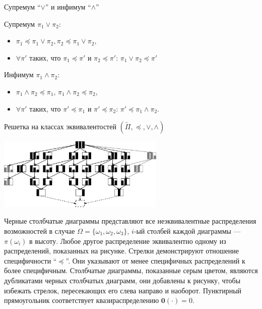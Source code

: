 \documentclass[russian, unicode, mathserif, aspectratio=169]{beamer}
\begin{document}
\begin{frame}{Супремум ``$\lor$'' и инфимум ``$\land$'' }
	
    \begin{definition}
    Супремум $\pi_1 \lor \pi_2$:
    \begin{itemize}
        \item $\pi_1 \preceq \pi_1 \lor \pi_2, \pi_2 \preceq \pi_1 \lor \pi_2$,
        \item $\forall \pi'$ таких, что $\pi_1 \preceq \pi'$ и $\pi_2 \preceq \pi'$: $\pi_1 \lor \pi_2 \preceq \pi'$
    \end{itemize}
    \end{definition}
    \begin{definition}
    Инфимум $\pi_1 \land \pi_2$:
    \begin{itemize}
        \item $\pi_1 \land \pi_2 \preceq \pi_1$, $\pi_1 \land \pi_2 \preceq \pi_2$,
        \item $\forall \pi'$ таких, что $\pi' \preceq \pi_1$ и $\pi' \preceq \pi_2$: $\pi' \preceq \pi_1 \land \pi_2$.
    \end{itemize}
    \end{definition}
	\justifying
	{\footnotesize
	}
\end{frame}

\begin{frame}{Решетка на классах эквивалентостей $(\widetilde{\Pi}, \preceq, \lor, \land)$}
    \begin{center}
	\includegraphics[width=0.6\textwidth]{pictures/three-point-omega.pdf}
	\end{center}
    Черные столбчатые диаграммы представляют все неэквивалентные распределения возможностей в случае $\Omega = \{\omega_1, \omega_2, \omega_3 \}$, $i$-ый столбей каждой диаграммы --- $\pi(\omega_i)$ в высоту. Любое другое распределение эквивалентно одному из распределений, показанных на рисунке. Стрелки демонстрируют отношение специфичности ``$\preceq$''. Они указывают от менее специфичных распределений к более специфичным. Столбчатые диаграммы, показанные серым цветом, являются дубликатами черных столбчатых диаграмм, они добавлены к рисунку, чтобы избежать стрелок, пересекающих его слева направо и наоборот. Пунктирный прямоугольник соответствует квазираспределению $\textbf{0}(\cdot) = 0$.
\end{frame}
\end{document}
